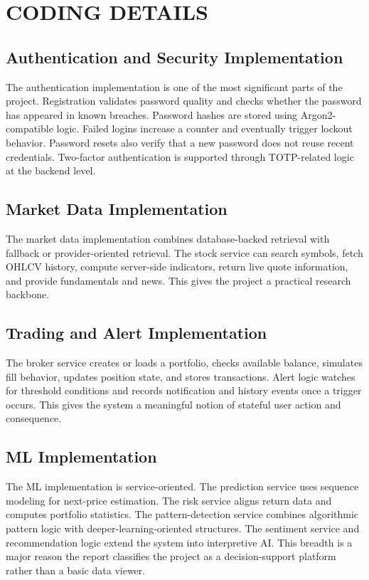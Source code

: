 \documentclass[12pt,a4paper]{report}
\begin{document}
\section{CODING DETAILS}
\subsection{Authentication and Security Implementation}
The authentication implementation is one of the most significant parts of the project. Registration validates password quality and checks whether the password has appeared in known breaches. Password hashes are stored using Argon2-compatible logic. Failed logins increase a counter and eventually trigger lockout behavior. Password resets also verify that a new password does not reuse recent credentials. Two-factor authentication is supported through TOTP-related logic at the backend level.

\subsection{Market Data Implementation}
The market data implementation combines database-backed retrieval with fallback or provider-oriented retrieval. The stock service can search symbols, fetch OHLCV history, compute server-side indicators, return live quote information, and provide fundamentals and news. This gives the project a practical research backbone.

\subsection{Trading and Alert Implementation}
The broker service creates or loads a portfolio, checks available balance, simulates fill behavior, updates position state, and stores transactions. Alert logic watches for threshold conditions and records notification and history events once a trigger occurs. This gives the system a meaningful notion of stateful user action and consequence.

\subsection{ML Implementation}
The ML implementation is service-oriented. The prediction service uses sequence modeling for next-price estimation. The risk service aligns return data and computes portfolio statistics. The pattern-detection service combines algorithmic pattern logic with deeper-learning-oriented structures. The sentiment service and recommendation logic extend the system into interpretive AI. This breadth is a major reason the report classifies the project as a decision-support platform rather than a basic data viewer.
\end{document}
